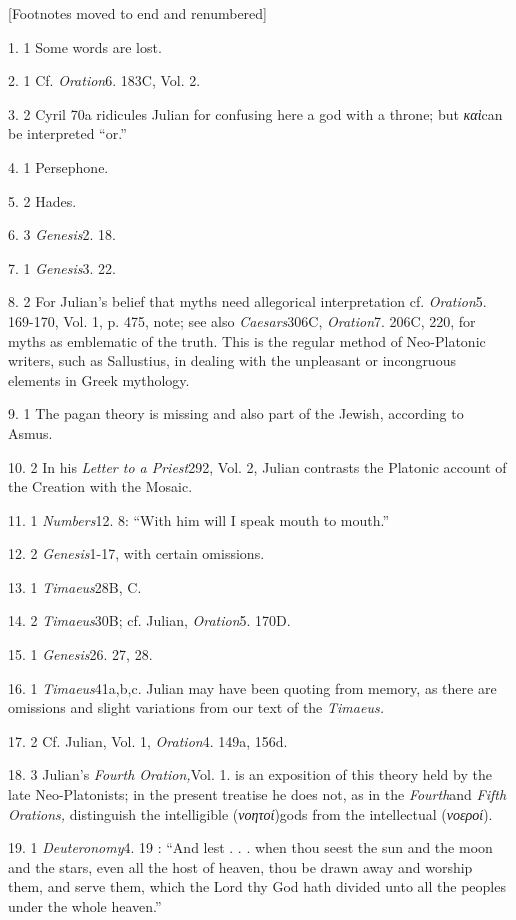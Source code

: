 [Footnotes moved to end and renumbered]

1. 1 Some words are lost.

2. 1 Cf. \emph{Oration}6. 183C, Vol. 2.

3. 2 Cyril 70a ridicules Julian for confusing here a god with a throne; but
\emph{καὶ}can be interpreted ``or.''

4. 1 Persephone.

5. 2 Hades.

6. 3 \emph{Genesis}2. 18.

7. 1 \emph{Genesis}3. 22.

8. 2 For Julian's belief that myths need allegorical interpretation cf. \emph{Oration}5. 169-170, Vol. 1, p. 475, note; see also \emph{Caesars}306C, \emph{Oration}7.
206C, 220, for myths as emblematic of the truth. This is the regular method of Neo-Platonic writers, such as Sallustius, in dealing with the unpleasant or incongruous elements in Greek mythology.

9. 1 The pagan theory is missing and also part of the Jewish, according to Asmus.

10. 2 In his \emph{Letter to a Priest}292, Vol. 2, Julian contrasts the Platonic account of the Creation with the Mosaic.

11. 1 \emph{Numbers}12. 8: ``With him will I speak mouth to mouth.''

12. 2 \emph{Genesis}1-17, with certain omissions.

13. 1 \emph{Timaeus}28B, C.

14. 2 \emph{Timaeus}30B; cf. Julian, \emph{Oration}5.
170D.

15. 1 \emph{Genesis}26. 27, 28.

16. 1 \emph{Timaeus}41a,b,c. Julian may have been quoting from memory, as there are omissions and slight variations from our text of the \emph{Timaeus.}

17. 2 Cf. Julian, Vol. 1, \emph{Oration}4. 149a, 156d.

18. 3 Julian's \emph{Fourth Oration,}Vol. 1. is an exposition of this theory held by the late Neo-Platonists; in the present treatise he does not, as in the \emph{Fourth}and \emph{Fifth Orations,}
distinguish the intelligible (\emph{νοητοί})\emph{}gods from the intellectual
(\emph{νοεροί}).

19. 1 \emph{Deuteronomy}4. 19 : ``And lest . . . when thou seest the sun and the moon and the stars, even all the host of heaven, thou be drawn away and worship them, and serve them, which the Lord thy God hath divided unto all the peoples under the whole heaven.''

